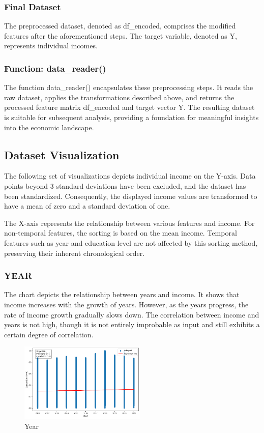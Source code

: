 \documentclass[twocolumn]{article}
\begin{document}
		\subsubsection{Final Dataset}
The preprocessed dataset, denoted as df\_encoded, comprises the modified features after the aforementioned steps. The target variable, denoted as Y, represents individual incomes.

		\subsubsection{Function: data\_reader()}
The function data\_reader() encapsulates these preprocessing steps. It reads the raw dataset, applies the transformations described above, and returns the processed feature matrix df\_encoded and target vector Y. The resulting dataset is suitable for subsequent analysis, providing a foundation for meaningful insights into the economic landscape.

	\subsection{Dataset Visualization}
The following set of visualizations depicts individual income on the Y-axis. Data points beyond 3 standard deviations have been excluded, and the dataset has been standardized. Consequently, the displayed income values are transformed to have a mean of zero and a standard deviation of one.

The X-axis represents the relationship between various features and income. For non-temporal features, the sorting is based on the mean income. Temporal features such as year and education level are not affected by this sorting method, preserving their inherent chronological order.
		\subsubsection{YEAR}
The chart depicts the relationship between years and income. It shows that income increases with the growth of years. However, as the years progress, the rate of income growth gradually slows down. The correlation between income and years is not high, though it is not entirely improbable as input and still exhibits a certain degree of correlation.
		\begin{figure}[H]
		\centering
		\includegraphics[width=6cm]{YEAR.png} 
		\caption{Year} 
		\label{Fig.YEAR} 
		\end{figure}
		
\end{document}
